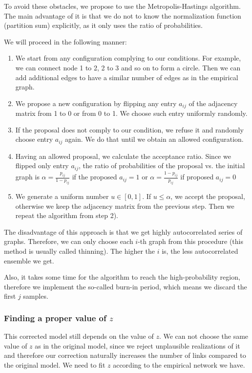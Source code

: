 To avoid these obstacles, we propose to use the Metropolis-Hastings algorithm. The main advantage of it is that we do not to know the normalization function (partition sum) explicitly, as it only uses the ratio of probabilities.

We will proceed in the following manner:

\begin{enumerate}
\item We start from any configuration complying to our conditions. For example, we can connect node 1 to 2, 2 to 3 and so on to form a circle. Then we can add additional edges to have a similar number of edges as in the empirical graph.
\item We propose a new configuration by flipping any entry $a_{ij}$ of the adjacency matrix from 1 to 0 or from 0 to 1. We choose such entry uniformly randomly.
\item If the proposal does not comply to our condition, we refuse it and randomly choose entry $a_{ij}$ again. We do that until we obtain an allowed configuration.
\item Having an allowed proposal, we calculate the acceptance ratio. Since we flipped only entry $a_{ij}$, the ratio of probabilities of the proposal vs. the initial graph is $\alpha = \frac{p_{ij}}{1-p_{ij}}$ if the proposed $a_{ij} = 1$ or $\alpha = \frac{1-p_{ij}}{p_{ij}}$ if proposed $a_{ij} = 0$
\item We generate a uniform number $u \in [0,1]$. If $u\leq\alpha$, we accept the proposal, otherwise we keep the adjacency matrix from the previous step. Then we repeat the algorithm from step 2).
\end{enumerate}

The disadvantage of this approach is that we get highly autocorrelated series of graphs. Therefore, we can only choose each $i$-th graph from this procedure (this method is usually called thinning). The higher the $i$ is, the less autocorrelated ensemble we get. 

Also, it takes some time for the algorithm to reach the high-probability region, therefore we implement the so-called burn-in period, which means we discard the first $j$ samples.

\subsubsection{Finding a proper value of $z$}
This corrected model still depends on the value of $z$. We can not choose the same value of $z$ as in the original model, since we reject unplausible realizations of it and therefore our correction naturally increases the number of links compared to the original model. We need to fit $z$ according to the empirical network we have.

